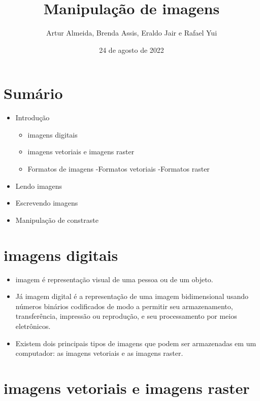 \documentclass[
]{article}
\title{Manipulação de imagens}
\author{Artur Almeida, Brenda Assis, Eraldo Jair e Rafael Yui}
\date{24 de agosto de 2022}
\providecommand{\tightlist}{%
  \setlength{\itemsep}{0pt}\setlength{\parskip}{0pt}}
\begin{document}
\maketitle

\hypertarget{sumuxe1rio}{%
\section{Sumário}\label{sumuxe1rio}}

\tableofcontents

\begin{itemize}
\tightlist
\item
  Introdução

  \begin{itemize}
  \tightlist
  \item
    imagens digitais
  \item
    imagens vetoriais e imagens raster
  \item
    Formatos de imagens -Formatos vetoriais -Formatos raster
  \end{itemize}
\item
  Lendo imagens
\item
  Escrevendo imagens
\item
  Manipulação de constraste
\end{itemize}

\hypertarget{imagens-digitais}{%
\section{imagens digitais}\label{imagens-digitais}}

\begin{itemize}
\item
  imagem é representação visual de uma pessoa ou de um objeto.
\item
  Já imagem digital é a representação de uma imagem bidimensional usando
  números binários codificados de modo a permitir seu armazenamento,
  transferência, impressão ou reprodução, e seu processamento por meios
  eletrônicos.
\item
  Existem dois principais tipos de imagens que podem ser armazenadas em
  um computador: as imagens vetoriais e as imagens raster.
\end{itemize}

\hypertarget{imagens-vetoriais-e-imagens-raster}{%
\section{imagens vetoriais e imagens
raster}\label{imagens-vetoriais-e-imagens-raster}}
\end{document}
